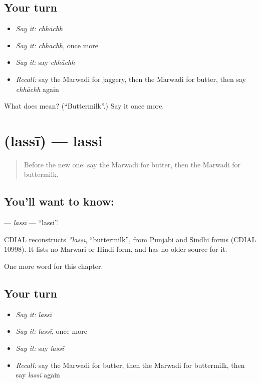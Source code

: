 \subsection*{Your turn}
\begin{itemize}
\raggedright
  \item \emph{Say it:} \emph{chhāchh}
  \item \emph{Say it:} \emph{chhāchh}, once more
  \item \emph{Say it:} say \emph{chhāchh}
  \item \emph{Recall:} say the Marwadi for jaggery, then the Marwadi for butter, then say \emph{chhāchh} again
\end{itemize}

\begin{tcolorbox}[breakable,colback=teal!4,colframe=teal!35!black,title={Before you move on}]
What does  mean? (\textquotedblleft{}Buttermilk\textquotedblright{}.) Say it once more.
\end{tcolorbox}
\section[\texorpdfstring{\mw{लस्सी} (lassī)}{लस्सी (lassī)}]{ (lassī) — lassi}

\label{lesson:MW-C134-lassi}



\begin{quote}
Before the new one: say the Marwadi for butter, then the Marwadi for buttermilk.
\end{quote}

\subsection*{You'll want to know: }
\textbf{} — \emph{lassī} — \textquotedblleft{}lassi\textquotedblright{}.

\begin{cousinweb}
CDIAL reconstructs \emph{*lassī}, \textquotedblleft{}buttermilk\textquotedblright{}, from Punjabi and Sindhi forms (CDIAL 10998). It lists no Marwari or Hindi form, and has no older source for it.
\end{cousinweb}

\begin{grammarlens}[title={What you've built}]
One more word for this chapter.
\end{grammarlens}

\subsection*{Your turn}
\begin{itemize}
\raggedright
  \item \emph{Say it:} \emph{lassī}
  \item \emph{Say it:} \emph{lassī}, once more
  \item \emph{Say it:} say \emph{lassī}
  \item \emph{Recall:} say the Marwadi for butter, then the Marwadi for buttermilk, then say \emph{lassī} again
\end{itemize}

